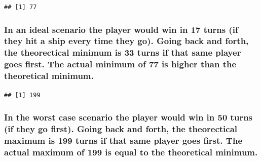 \documentclass[
]{article}
\newenvironment{Shaded}{\begin{snugshade}}{\end{snugshade}}
\newcommand{\CommentTok}[1]{\textcolor[rgb]{0.56,0.35,0.01}{\textit{#1}}}
\newcommand{\ControlFlowTok}[1]{\textcolor[rgb]{0.13,0.29,0.53}{\textbf{#1}}}
\newcommand{\DecValTok}[1]{\textcolor[rgb]{0.00,0.00,0.81}{#1}}
\newcommand{\FunctionTok}[1]{\textcolor[rgb]{0.13,0.29,0.53}{\textbf{#1}}}
\newcommand{\NormalTok}[1]{#1}
\newcommand{\SpecialCharTok}[1]{\textcolor[rgb]{0.81,0.36,0.00}{\textbf{#1}}}
\begin{document}
\begin{Shaded}
\end{Shaded}

\begin{verbatim}
## [1] 77
\end{verbatim}

\subsubsection{In an ideal scenario the player would win in 17 turns (if
they hit a ship every time they go). Going back and forth, the
theorectical minimum is 33 turns if that same player goes first. The
actual minimum of 77 is higher than the theoretical
minimum.}\label{in-an-ideal-scenario-the-player-would-win-in-17-turns-if-they-hit-a-ship-every-time-they-go.-going-back-and-forth-the-theorectical-minimum-is-33-turns-if-that-same-player-goes-first.-the-actual-minimum-of-77-is-higher-than-the-theoretical-minimum.}

\begin{Shaded}
\end{Shaded}

\begin{verbatim}
## [1] 199
\end{verbatim}

\subsubsection{In the worst case scenario the player would win in 50
turns (if they go first). Going back and forth, the theorectical maximum
is 199 turns if that same player goes first. The actual maximum of 199
is equal to the theoretical
minimum.}\label{in-the-worst-case-scenario-the-player-would-win-in-50-turns-if-they-go-first.-going-back-and-forth-the-theorectical-maximum-is-199-turns-if-that-same-player-goes-first.-the-actual-maximum-of-199-is-equal-to-the-theoretical-minimum.-2}
\end{document}

